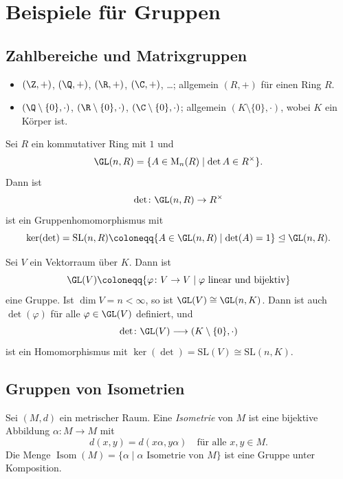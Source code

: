 \documentclass[11pt]{article}
\begin{document}
\section{Beispiele für Gruppen}

\subsection{Zahlbereiche und Matrixgruppen}

\begin{example}
  \begin{itemize}
    \item $(\Z, +)$, $(\Q, +)$, $(\R, +)$, $(\C, +)$, \dots; allgemein $(R, +)$ für einen Ring $R$.
    \item $(\Q \setminus \{0\}, \cdot)$, $(\R \setminus \{0\}, \cdot)$, $(\C \setminus \{0\}, \cdot)$; allgemein $(K \setminus \{0\}, \cdot)$, wobei $K$ ein Körper ist.
  \end{itemize}
\end{example}

\begin{example}
  Sei $R$ ein kommutativer Ring mit $1$ und
  \[ \GL(n, R) = \{ A \in \mathrm{M}_n(R) \mid \det A \in R^{\times} \}. \]
  Dann ist
  \[ \det\colon \GL(n, R) \to R^{\times} \]
  ist ein Gruppenhomomorphismus mit
  \[ \ker(\det) = \mathrm{SL}(n, R) \coloneqq \{ A \in \GL(n, R) \mid \det(A) = 1 \} \trianglelefteq \GL(n, R). \]
\end{example}


\begin{example}
  Sei $V$ ein Vektorraum über $K$. Dann ist
  \[ \GL(V) \coloneqq \{ \varphi\colon V \to V \mid \varphi \text{ linear und bijektiv} \} \]
  eine Gruppe.
  Ist $\dim V = n < \infty$, so ist $\GL(V) \cong \GL(n, K)$. Dann ist auch $\det(\varphi)$ für alle $\varphi \in \GL(V)$ definiert, und
  \[ \det\colon \GL(V) \longrightarrow (K \setminus \{0\}, \cdot) \]
  ist ein Homomorphismus mit $\ker(\det) = \mathrm{SL}(V) \cong \mathrm{SL}(n, K)$.
\end{example}

\subsection{Gruppen von Isometrien}

\begin{definition}[Isometrie]\Theorem
  Sei $(M, d)$ ein metrischer Raum. Eine \emph{Isometrie} von $M$ ist eine bijektive Abbildung $\alpha\colon M \to M$ mit
  \[ d(x, y) = d(x\alpha, y\alpha) \quad \text{für alle } x, y \in M. \]
  Die Menge $\operatorname{Isom}(M) = \{\alpha \mid \alpha \text{ Isometrie von } M\}$ ist eine Gruppe unter Komposition.
\end{definition}
\end{document}
